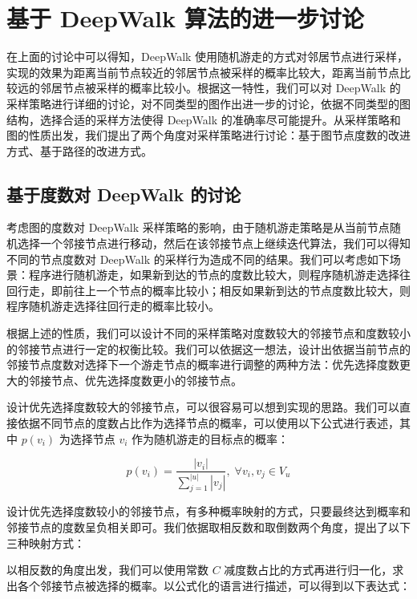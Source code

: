 \documentclass{ctexart}
\begin{document}
\newpage

\section{基于 DeepWalk 算法的进一步讨论}

在上面的讨论中可以得知，DeepWalk 使用随机游走的方式对邻居节点进行采样，实现的效果为距离当前节点较近的邻居节点被采样的概率比较大，距离当前节点比较远的邻居节点被采样的概率比较小。根据这一特性，我们可以对 DeepWalk 的采样策略进行详细的讨论，对不同类型的图作出进一步的讨论，依据不同类型的图结构，选择合适的采样方法使得 DeepWalk 的准确率尽可能提升。从采样策略和图的性质出发，我们提出了两个角度对采样策略进行讨论：基于图节点度数的改进方式、基于路径的改进方式。

\subsection{基于度数对 DeepWalk 的讨论}

考虑图的度数对 DeepWalk 采样策略的影响，由于随机游走策略是从当前节点随机选择一个邻接节点进行移动，然后在该邻接节点上继续迭代算法，我们可以得知不同的节点度数对 DeepWalk 的采样行为造成不同的结果。我们可以考虑如下场景：程序进行随机游走，如果新到达的节点的度数比较大，则程序随机游走选择往回行走，即前往上一个节点的概率比较小；相反如果新到达的节点度数比较大，则程序随机游走选择往回行走的概率比较小。

根据上述的性质，我们可以设计不同的采样策略对度数较大的邻接节点和度数较小的邻接节点进行一定的权衡比较。我们可以依据这一想法，设计出依据当前节点的邻接节点度数对选择下一个游走节点的概率进行调整的两种方法：优先选择度数更大的邻接节点、优先选择度数更小的邻接节点。


设计优先选择度数较大的邻接节点，可以很容易可以想到实现的思路。我们可以直接依据不同节点的度数占比作为选择节点的概率，可以使用以下公式进行表述，其中 \(p(v_i)\) 为选择节点 \(v_i\) 作为随机游走的目标点的概率：

$$
p(v_i) = \frac{|v_i|}{\sum_{j=1}^{|u|} |v_j|}, \;\forall v_i, v_j \in V_u
$$

设计优先选择度数较小的邻接节点，有多种概率映射的方式，只要最终达到概率和邻接节点的度数呈负相关即可。我们依据取相反数和取倒数两个角度，提出了以下三种映射方式：

以相反数的角度出发，我们可以使用常数 \(C\) 减度数占比的方式再进行归一化，求出各个邻接节点被选择的概率。以公式化的语言进行描述，可以得到以下表达式：
\end{document}
